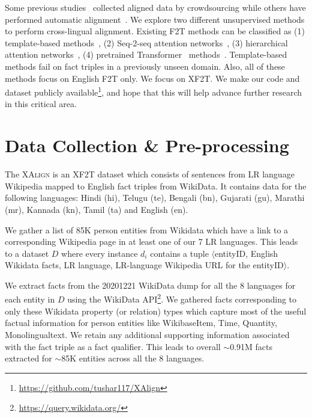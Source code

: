 \documentclass[11pt]{article}
\def\langCount{8}
\def\lrLangCount{7}
\begin{document}
Some previous studies~\cite{gardent2017webnlg} collected aligned data by crowdsourcing while others have performed automatic alignment~\cite{agarwal2021knowledge}. We explore two different unsupervised methods to perform cross-lingual alignment. Existing F2T methods can be classified as (1) template-based  methods~\cite{cimiano2013exploiting,duma2013generating}, (2) Seq-2-seq attention networks~\cite{lebret2016wikibio,mei2016talk,shahidi2020two}, (3) hierarchical attention networks~\cite{nema2018generating,chen2020kgpt}, (4) pretrained Transformer~\cite{vaswani2017attention} methods~\cite{ribeiro2021investigating,zhao2020bridging,chen2020kgpt,fu2020partially}. Template-based methods fail on fact triples in a previously unseen domain. Also, all of these methods focus on English F2T only. We focus on XF2T. We make our code and dataset publicly available\footnote{\url{https://github.com/tushar117/XAlign}\label{datafootnote}}, and hope that this will help advance further research in this critical area.



\section{Data Collection \& Pre-processing}
\label{sec:cross_creation}
The \textsc{XAlign} is an XF2T dataset which consists of sentences from LR language Wikipedia mapped to English fact triples from WikiData. It contains data for the following languages: Hindi (hi), Telugu (te), Bengali (bn), Gujarati (gu), Marathi (mr), Kannada (kn), Tamil (ta) and English (en). 




We gather a list of 85K person entities from Wikidata which have a link to a corresponding Wikipedia page in at least one of our \lrLangCount{} LR languages. This leads to a dataset $D$ where every instance $d_i$ contains a tuple $\langle$entityID, English Wikidata facts, LR language, LR-language Wikipedia URL for the entityID$\rangle$.



We extract facts from the 20201221 WikiData dump for all the \langCount{} languages for each entity in $D$ using the WikiData API\footnote{\url{https://query.wikidata.org/}}. We gathered facts corresponding to only these Wikidata property (or relation) types which capture most of the useful factual information for person entities like WikibaseItem, Time, Quantity, Monolingualtext. We retain any additional supporting information associated with the fact triple as a fact qualifier. This leads to overall  $\sim$0.91M facts extracted for $\sim$85K entities across all the \langCount{} languages. 
\end{document}
